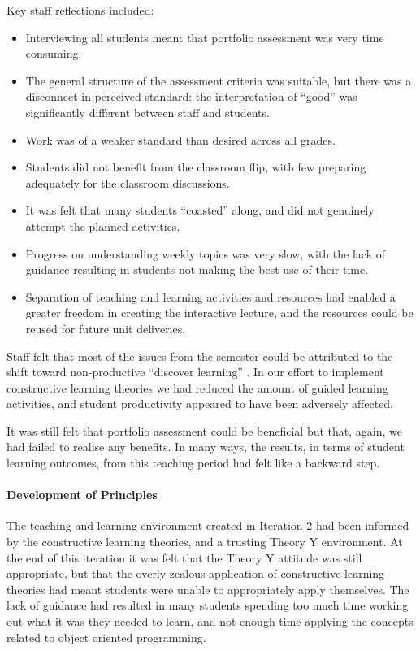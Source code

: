 Key staff reflections included:
\begin{itemize}[noitemsep,nolistsep]
  \item Interviewing all students meant that portfolio assessment was very time consuming.
  \item The general structure of the assessment criteria was suitable, but there was a disconnect in perceived standard: the interpretation of ``good'' was significantly different between staff and students.
  \item Work was of a weaker standard than desired across all grades.
  \item Students did not benefit from the classroom flip, with few preparing adequately for the classroom discussions.
  \item It was felt that many students ``coasted'' along, and did not genuinely attempt the planned activities.
  \item Progress on understanding weekly topics was very slow, with the lack of guidance resulting in students not making the best use of their time.
  \item Separation of teaching and learning activities and resources had enabled a greater freedom in creating the interactive lecture, and the resources could be reused for future unit deliveries.
\end{itemize}

Staff felt that most of the issues from the semester could be attributed to the shift toward non-productive ``discover learning'' \cite{Anderson:1998}. In our effort to implement constructive learning theories we had reduced the amount of guided learning activities, and student productivity appeared to have been adversely affected.

It was still felt that portfolio assessment could be beneficial but that, again, we had failed to realise any benefits. In many ways, the results, in terms of student learning outcomes, from this teaching period had felt like a backward step.

\paragraph{Development of Principles} %

The teaching and learning environment created in Iteration 2 had been informed by the constructive learning theories, and a trusting Theory Y environment. At the end of this iteration it was felt that the Theory Y attitude was still appropriate, but that the overly zealous application of constructive learning theories had meant students were unable to appropriately apply themselves. The lack of guidance had resulted in many students spending too much time working out what it was they needed to learn, and not enough time applying the concepts related to object oriented programming.

